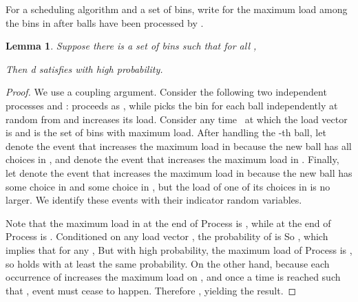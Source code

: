 \documentclass[10pt,conference,letterpaper]{IEEEtran}
\newtheorem{lemma}[theorem]{Lemma}
\begin{document}
For a scheduling algorithm  and a set  of bins, write  for the maximum load among the bins in  after  balls have been
processed by .
\begin{lemma}\label{lem:perfect}
Suppose there is a set  of bins such that for all ,
        
Then d satisfies  with high probability.
\end{lemma}
\begin{proof}
We use a coupling argument. Consider the following two independent processes  and :  proceeds as
, while  picks the bin for each ball independently at
random from  and increases its load. Consider any time~ at which the load vector is 
and  is the set of bins with
maximum load. After handling the -th ball, let  denote the event that  increases the maximum load in  because the new ball has all choices in
, and  denote the event that  increases the maximum load in . Finally, let  denote the event
that  increases the maximum load in  because the new ball has some choice in  and some choice in , but the load of one of  its choices in  is no larger. We identify these events with their indicator
random variables.

Note that the maximum load in  at the end of Process  is , while  at the
end of Process  is . Conditioned on any load vector , the probability of  is 
So , which implies that for any ,  But with high probability, the maximum load of Process  is , so 
holds with at least the same probability. On the other hand,  because each occurrence of
 increases the maximum load on , and once a time  is reached such that , event  must cease to happen. Therefore
,
yielding the result.
\end{proof}
\end{document}
